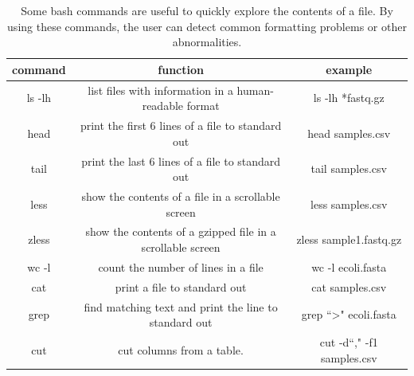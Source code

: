 \documentclass[10pt,letterpaper]{article}
\begin{document}
\begin{table}
\begin{tabular}{|c|c|c|}
\hline
\textbf{command} & \textbf{function} & \textbf{example} \\
\hline
ls -lh & list files with information in a human-readable format & ls -lh *fastq.gz \\
\hline
head & print the first 6 lines of a file to standard out & head samples.csv \\
\hline
tail & print the last 6 lines of a file to standard out & tail samples.csv \\
\hline
less & show the contents of a file in a scrollable screen & less samples.csv \\
\hline
zless & show the contents of a gzipped file in a scrollable screen & zless sample1.fastq.gz \\
\hline
wc -l & count the number of lines in a file & wc -l ecoli.fasta \\
\hline
cat & print a file to standard out & cat samples.csv \\
\hline
grep & find matching text and print the line to standard out & grep ``\textgreater" ecoli.fasta \\
\hline
cut & cut columns from a table. & cut -d``," -f1 samples.csv \\
\hline
\end{tabular} 
\caption{\label{tab:bash_commands} Some bash commands are useful to quickly explore the contents of a file. By using these commands, the user can detect common formatting problems or other abnormalities.}
\end{table}
\end{document}
